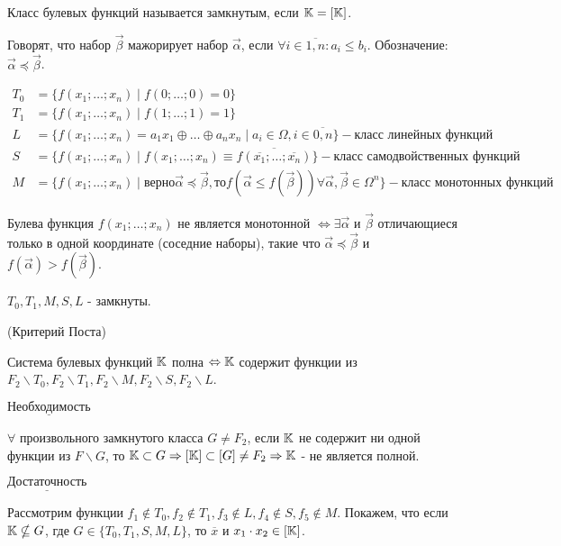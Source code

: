 \opr Класс булевых функций называется замкнутым, если $\mathbb{K} = [\mathbb{K}]$.

Говорят, что набор $\vec{\beta}$ мажорирует набор $\vec{\alpha}$, если $\forall i \in \overline{1, n}: a_i \leq b_i$. Обозначение: $\vec{\alpha} \preccurlyeq \vec{\beta}$.

\examplei
\begin{align*}
    T_0 &= \{f(x_1; \dots; x_n) \mid f(0; \dots; 0) = 0\}\\
    T_1 &= \{f(x_1; \dots; x_n) \mid f(1; \dots; 1) = 1\}\\
    L   &= \{f(x_1; \dots; x_n) = a_1x_1 \oplus \dots \oplus a_nx_n \mid a_i \in \Omega, i \in \overline{0, n}\} - \text{класс линейных функций}\\
    S   &= \{f(x_1; \dots; x_n) \mid f(x_1; \dots; x_n) \equiv \overline{f(\overline{x_1}; \dots; \overline{x_n})} \} - \text{класс самодвойственных функций} \\
    M   &= \{f(x_1; \dots; x_n) \mid \text{верно} \vec{\alpha} \preccurlyeq \vec{\beta}, \text{то} f(\vec{\alpha} \leq f(\vec{\beta})) \forall \vec{\alpha}, \vec{\beta} \in \Omega^n\} - \text{класс монотонных функций}
\end{align*}

\lem Булева функция $f(x_1; \dots; x_n)$ не является монотонной $\Leftrightarrow \exists \vec{\alpha}$ и $\vec{\beta}$ отличающиеся
только в одной координате (соседние наборы), такие что $\vec{\alpha} \preccurlyeq \vec{\beta}$ и $f(\vec{\alpha}) > f(\vec{\beta})$.

\thr $T_0, T_1, M, S, L$ - замкнуты.

\thr (Критерий Поста)

Система булевых функций $\mathbb{K}$ полна $\Leftrightarrow \mathbb{K}$ содержит функции из $F_2 \backslash T_0, F_2 \backslash T_1, F_2 \backslash M, F_2 \backslash S, F_2 \backslash L$.

\proof 

    $\underline{\text{Необходимость}}$

    $\forall$ произвольного замкнутого класса $G \neq F_2$, если $\mathbb{K}$ не содержит ни одной функции из $F \backslash G$, то $\mathbb{K} \subset G \Rightarrow [\mathbb{K}] \subset [G] \neq F_2 \Rightarrow \mathbb{K}$ - не
является полной.

    $\underline{\text{Достаточность}}$

    Рассмотрим функции $f_1 \notin T_0, f_2 \notin T_1, f_3 \notin L, f_4 \notin S, f_5 \notin M$.
    Покажем, что если $\mathbb{K} \nsubseteq G$, где $G \in \{T_0, T_1, S, M, L\}$, то $\overline{x}$ и $x_1\cdot x_2 \in [\mathbb{K}]$.

